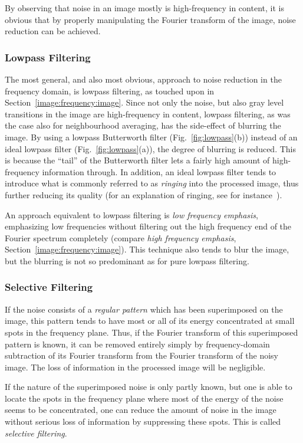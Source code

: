 By observing that noise in an image mostly is high-frequency in
content, it is obvious that by properly manipulating the Fourier
transform of the image, noise reduction can be achieved.

\subsubsection{Lowpass Filtering}

The most general, and also most obvious, approach to noise reduction
in the frequency domain, is lowpass filtering, as touched upon in
Section~\ref{image:frequency:image}.  Since not only the noise, but
also gray level transitions in the image are high-frequency in
content, lowpass filtering, as was the case also for neighbourhood
averaging, has the side-effect of blurring the image.  By using a
lowpass Butterworth filter (Fig.~\ref{fig:lowpass}(b)) instead of an
ideal lowpass filter (Fig.~\ref{fig:lowpass}(a)), the degree of
blurring is reduced.  This is because the ``tail'' of the Butterworth
filter lets a fairly high amount of high-frequency information
through.  In addition, an ideal lowpass filter tends to introduce what
is commonly referred to as {\em ringing\/} into the processed image,
thus further reducing its quality (for an explanation of ringing, see
for instance~\cite{digim}).

An approach equivalent to lowpass filtering is {\em low frequency
  emphasis\/}, emphasizing low frequencies without filtering out the
high frequency end of the Fourier spectrum completely (compare {\em
  high frequency emphasis\/}, Section~\ref{image:frequency:image}).
This technique also tends to blur the image, but the blurring is not
so predominant as for pure lowpass filtering.

\subsubsection{Selective Filtering}

If the noise consists of a {\em regular pattern\/} which has been
superimposed on the image, this pattern tends to have most or all of
its energy concentrated at small spots in the frequency plane.  Thus,
if the Fourier transform of this superimposed pattern is known, it can
be removed entirely simply by frequency-domain subtraction of its
Fourier transform from the Fourier transform of the noisy image.  The
loss of information in the processed image will be negligible.

If the nature of the superimposed noise is only partly known, but one
is able to locate the spots in the frequency plane where most of the
energy of the noise seems to be concentrated, one can reduce the
amount of noise in the image without serious loss of information by
suppressing these spots.  This is called {\em selective filtering\/}.
